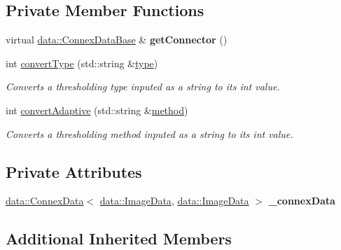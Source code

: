 \subsection*{Private Member Functions}
\begin{DoxyCompactItemize}
\item 
\mbox{\label{classfilter_1_1algos_1_1_binary_adaptive_a1fe10a09e339e48dc98df4d0642cb816}} 
virtual \hyperlink{classfilter_1_1data_1_1_connex_data_base}{data\+::\+Connex\+Data\+Base} \& {\bfseries get\+Connector} ()
\item 
int \hyperlink{classfilter_1_1algos_1_1_binary_adaptive_a06e3ad587fb9e958e19ded273c70e4e1}{convert\+Type} (std\+::string \&\hyperlink{classfilter_1_1algos_1_1_binary_adaptive_a8256a8c340fbc64eaf1fa4232d910435}{type})
\begin{DoxyCompactList}\small\item\em Converts a thresholding type inputed as a string to its int value. \end{DoxyCompactList}\item 
int \hyperlink{classfilter_1_1algos_1_1_binary_adaptive_a2cca79f85248dff026bf39d1940a60d6}{convert\+Adaptive} (std\+::string \&\hyperlink{classfilter_1_1algos_1_1_binary_adaptive_a67df7719f9d5ace093fb1b70455f7a4f}{method})
\begin{DoxyCompactList}\small\item\em Converts a thresholding method inputed as a string to its int value. \end{DoxyCompactList}\end{DoxyCompactItemize}
\subsection*{Private Attributes}
\begin{DoxyCompactItemize}
\item 
\mbox{\label{classfilter_1_1algos_1_1_binary_adaptive_ad56ec711d50924b0f401a86550767afb}} 
\hyperlink{classfilter_1_1data_1_1_connex_data}{data\+::\+Connex\+Data}$<$ \hyperlink{classfilter_1_1data_1_1_image_data}{data\+::\+Image\+Data}, \hyperlink{classfilter_1_1data_1_1_image_data}{data\+::\+Image\+Data} $>$ {\bfseries \+\_\+connex\+Data}
\end{DoxyCompactItemize}
\subsection*{Additional Inherited Members}


